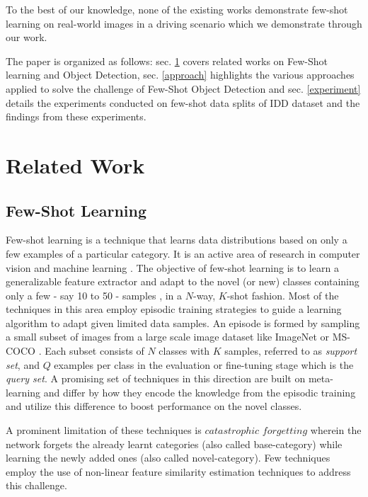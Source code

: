 \documentclass[letterpaper]{article} %
\begin{document}
To the best of our knowledge, none of the existing works demonstrate few-shot learning on real-world images in a driving scenario which we demonstrate through our work.

The paper is organized as follows: sec. \ref{related} covers related works on Few-Shot learning and Object Detection, sec. \ref{approach} highlights the various approaches applied to solve the challenge of Few-Shot Object Detection and sec. \ref{experiment} details the experiments conducted on few-shot data splits of IDD dataset and the findings from these experiments.

\section{Related Work}
\label{related}
\subsection{Few-Shot Learning}
\label{related:fscl}
Few-shot learning is a technique that learns data distributions based on only a few examples of a particular category. It is an active area of research in computer vision and machine learning \cite{closerfewshot}.
The objective of few-shot learning is to learn a generalizable feature extractor and adapt to the novel (or new) classes containing only a few - say 10 to 50 - samples \cite{protonet,matching-net}, in a $N$-way, $K$-shot fashion.
Most of the techniques in this area employ episodic training strategies \cite{local_desc,matching-net,protonet} to guide a learning algorithm to adapt given limited data samples.
An episode is formed by sampling a small subset of images from a large scale image dataset like ImageNet \cite{imagenet} or MS-COCO \cite{coco}. Each subset consists of $N$ classes with $K$ samples, referred to as \emph{support set}, and $Q$ examples per class in the evaluation or fine-tuning stage which is the \emph{query set}.   
A  promising set of techniques in this direction are built on meta-learning \cite{maml,local_desc,relation-net,closerfewshot} and differ by how they encode the knowledge from the episodic training and utilize this difference to boost performance on the novel classes.

A prominent limitation of these techniques is $catastrophic$ $forgetting$ wherein the network forgets the already learnt categories (also called base-category) while learning the newly added ones (also called novel-category). Few techniques employ the use of non-linear feature similarity estimation techniques \cite{nonforget} to address this challenge. 
\end{document}
